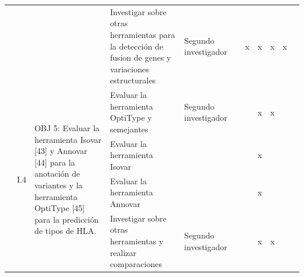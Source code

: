 \documentclass[a4paper,11pt]{article}
\begin{document}
\begin{table}[H]
\begin{tabular}{p{0.6cm}p{0.6cm}p{6cm}p{4cm}p{1cm}cccccc}
		&                       &                                                                                                                                                                                                                                                                                            & Investigar sobre otras herramientas para la detección de fusion de genes y variaciones estructurales & Segundo investigador               &                       & \multicolumn{1}{c}{x}  & x                    & x                    & \multicolumn{1}{c}{x} &                        \\
		& \multirow{5}{*}{I.4}  & \multirow{5}{6cm}{OBJ 5: Evaluar la herramienta Isovar {[}43{]} y Annovar {[}44{]} para la anotación de variantes y la herramienta OptiType {[}45{]} para la predicción de tipos de HLA.}                                                                                                 & Evaluar la herramienta OptiType y semejantes                                                         & Segundo investigador               &                       &                        & x                    & x                    &                       &                        \\
		&                       &                                                                                                                                                                                                                                                                                            & Evaluar la herramienta Isovar                                                                        &                    &                       &                        & x                    & \multicolumn{1}{l}{} &                       &                        \\
		&                       &                                                                                                                                                                                                                                                                                            & Evaluar la herramienta Annovar                                                                       &                    &                       &                        & x                    & \multicolumn{1}{l}{} &                       &                        \\
		&                       &                                                                                                                                                                                                                                                                                            & Investigar sobre otras herramientas y realizar comparaciones                                         & Segundo investigador               &                       &                        & x                    & x                    &                       &                        \\

\end{tabular}
\end{table}
\end{document}
